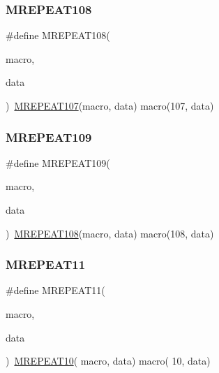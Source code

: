 \mbox{\label{group__group__sam0__utils__mrepeat_gacfbea84aacb4958d50fc747c7f512dcb}} 
\subsubsection{\texorpdfstring{MREPEAT108}{MREPEAT108}}
{\footnotesize\ttfamily \#define M\+R\+E\+P\+E\+A\+T108(\begin{DoxyParamCaption}\item[{}]{macro,  }\item[{}]{data }\end{DoxyParamCaption})~\mbox{\hyperlink{group__group__sam0__utils__mrepeat_ga0cddcc3fa390ae9e30eaf07e9223be42}{M\+R\+E\+P\+E\+A\+T107}}(macro, data)   macro(107, data)}

\mbox{\label{group__group__sam0__utils__mrepeat_ga3756d19974e9584f0e8f0c6e404c8f61}} 
\subsubsection{\texorpdfstring{MREPEAT109}{MREPEAT109}}
{\footnotesize\ttfamily \#define M\+R\+E\+P\+E\+A\+T109(\begin{DoxyParamCaption}\item[{}]{macro,  }\item[{}]{data }\end{DoxyParamCaption})~\mbox{\hyperlink{group__group__sam0__utils__mrepeat_gacfbea84aacb4958d50fc747c7f512dcb}{M\+R\+E\+P\+E\+A\+T108}}(macro, data)   macro(108, data)}

\mbox{\label{group__group__sam0__utils__mrepeat_gabd366a56c6734a5ce3ff89dc84760244}} 
\subsubsection{\texorpdfstring{MREPEAT11}{MREPEAT11}}
{\footnotesize\ttfamily \#define M\+R\+E\+P\+E\+A\+T11(\begin{DoxyParamCaption}\item[{}]{macro,  }\item[{}]{data }\end{DoxyParamCaption})~\mbox{\hyperlink{group__group__sam0__utils__mrepeat_gade8cd92280a999cf105148e3fa4c5da9}{M\+R\+E\+P\+E\+A\+T10}}( macro, data)   macro( 10, data)}

